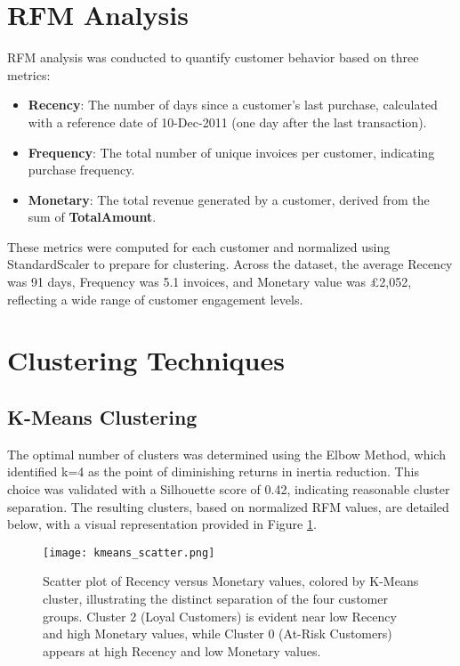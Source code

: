 \documentclass[a4paper,12pt]{article}
\begin{document}
\section{RFM Analysis}

RFM analysis was conducted to quantify customer behavior based on three metrics:
\begin{itemize}
    \item \textbf{Recency}: The number of days since a customer's last purchase, calculated with a reference date of 10-Dec-2011 (one day after the last transaction).
    \item \textbf{Frequency}: The total number of unique invoices per customer, indicating purchase frequency.
    \item \textbf{Monetary}: The total revenue generated by a customer, derived from the sum of \textbf{TotalAmount}.
\end{itemize}
These metrics were computed for each customer and normalized using StandardScaler to prepare for clustering. Across the dataset, the average Recency was 91 days, Frequency was 5.1 invoices, and Monetary value was £2,052, reflecting a wide range of customer engagement levels.

\section{Clustering Techniques}

\subsection{K-Means Clustering}

The optimal number of clusters was determined using the Elbow Method, which identified k=4 as the point of diminishing returns in inertia reduction. This choice was validated with a Silhouette score of 0.42, indicating reasonable cluster separation. The resulting clusters, based on normalized RFM values, are detailed below, with a visual representation provided in Figure \ref{fig:kmeans_scatter}.

\begin{figure}[H]
    \centering
    \texttt{[image: kmeans\_scatter.png]}
    \caption{Scatter plot of Recency versus Monetary values, colored by K-Means cluster, illustrating the distinct separation of the four customer groups. Cluster 2 (Loyal Customers) is evident near low Recency and high Monetary values, while Cluster 0 (At-Risk Customers) appears at high Recency and low Monetary values.}
    \label{fig:kmeans_scatter}
\end{figure}
\end{document}
